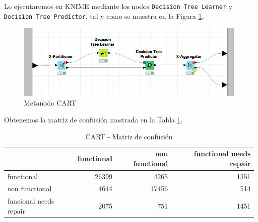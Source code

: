 \documentclass[a4paper, 20pt]{article}
\begin{document}
Lo ejecutaremos en KNIME mediante los nodos \texttt{Decision Tree Learner} y \texttt{Decision Tree Predictor}, tal y como se muestra en la Figura \ref{fig:Tree}.

\begin{figure}[H]
    \centering
    \includegraphics[width=1\textwidth]{Tree}
    \caption{Metanodo CART}
    \label{fig:Tree}
\end{figure}

Obtenemos la matriz de confusión mostrada en la Tabla \ref{tab:CMTree}.

\begin{table}[H]
  \centering
  \caption{CART - Matriz de confusión}
  \label{tab:CMTree}
  \begin{tabular}{lrrr}
    \toprule
    & functional & non functional & functional needs repair\\ \midrule
    functional & 26399 & 4265 & 1351\\
    non functional & 4644 & 17456 & 514\\
    funcional needs repair & 2075 & 751 & 1451\\
    \bottomrule
  \end{tabular}
\end{table}


\end{document}
